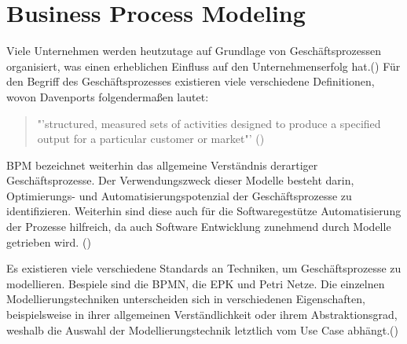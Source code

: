 \section{Business Process Modeling}
Viele Unternehmen werden heutzutage auf Grundlage von Geschäftsprozessen organisiert, was einen erheblichen Einfluss auf den Unternehmenserfolg hat.(\cite[vgl.][1]{BPM2}) Für den Begriff des Geschäftsprozesses existieren viele verschiedene Definitionen, wovon Davenports folgendermaßen lautet: 
\begin{quote}
"'structured, measured sets of activities designed to produce a specified output for a particular customer or market"' (\cite[5]{DAVENPORT})
\end{quote} \ac{BPM} bezeichnet weiterhin das allgemeine Verständnis derartiger Geschäftsprozesse. Der Verwendungszweck dieser Modelle besteht darin, Optimierungs- und Automatisierungspotenzial der Geschäftsprozesse zu identifizieren. Weiterhin sind diese auch für die Softwaregestütze Automatisierung der Prozesse hilfreich, da auch Software Entwicklung zunehmend durch Modelle getrieben wird. (\cite[vgl.][74]{BPM})\par
Es existieren viele verschiedene Standards an Techniken, um  Geschäftsprozesse zu modellieren. Bespiele sind die \ac{BPMN}, die \ac{EPK} und Petri Netze. Die einzelnen Modellierungstechniken unterscheiden sich in verschiedenen Eigenschaften, beispielsweise in ihrer allgemeinen Verständlichkeit oder ihrem Abstraktionsgrad, weshalb die Auswahl der Modellierungstechnik letztlich vom Use Case abhängt.(\cite[vgl.][75]{BPM2})